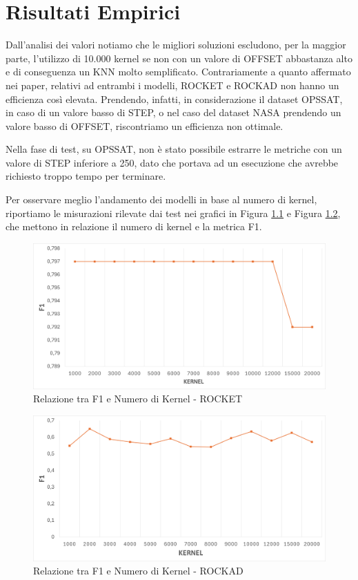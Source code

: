 \chapter{Risultati Empirici}
Dall'analisi dei valori notiamo che le migliori soluzioni escludono, per la maggior parte, l'utilizzo di 10.000 kernel se non con un valore di OFFSET abbastanza alto e di conseguenza un KNN molto semplificato.
Contrariamente a quanto affermato nei paper, relativi ad entrambi i modelli, ROCKET e ROCKAD non hanno un efficienza così elevata.
Prendendo, infatti, in considerazione il dataset OPS\textunderscore SAT, in caso di un valore basso di STEP, o nel caso del dataset NASA prendendo un valore basso di OFFSET, riscontriamo un efficienza non ottimale.

Nella fase di test, su OPS\textunderscore SAT, non è stato possibile estrarre le metriche con un valore di STEP inferiore a 250, dato che portava ad un esecuzione che avrebbe richiesto troppo tempo per terminare.

Per osservare meglio l'andamento dei modelli in base al numero di kernel, riportiamo le misurazioni rilevate dai test nei grafici in Figura \ref{fig:grafico_f1_ROCKET_OPS_SAT} e Figura \ref{fig:grafico_f1_ROCKAD_OPS_SAT}, che mettono in relazione il numero di kernel e la metrica F1.
\begin{figure}[!ht]
    \centering
    \includegraphics[width=0.9\linewidth]{images//Capitolo7/GraficoF1_ROCKET_OPS_SAT.png}
    \caption{Relazione tra F1 e Numero di Kernel - ROCKET}
    \label{fig:grafico_f1_ROCKET_OPS_SAT}
\end{figure}
\pagebreak

\begin{figure}[!ht]
    \centering
    \includegraphics[width=0.9\linewidth]{images//Capitolo7/GraficoF1_ROCKAD_OPS_SAT.png}
    \caption{Relazione tra F1 e Numero di Kernel - ROCKAD}
    \label{fig:grafico_f1_ROCKAD_OPS_SAT}
\end{figure}

